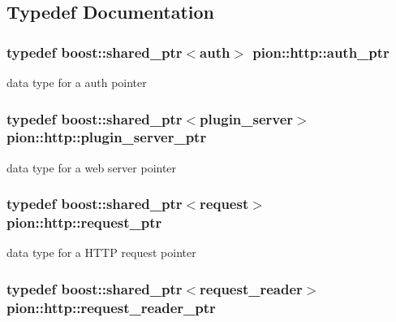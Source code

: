 \subsection{Typedef Documentation}
\hypertarget{namespacepion_1_1http_ad4fb4365aa7da70980fe02dfb13773e4}{
\subsubsection[{auth\-\_\-ptr}]{\setlength{\rightskip}{0pt plus 5cm}typedef boost\-::shared\-\_\-ptr$<${\bf auth}$>$ {\bf pion\-::http\-::auth\-\_\-ptr}}}\label{namespacepion_1_1http_ad4fb4365aa7da70980fe02dfb13773e4}


data type for a auth pointer 

\hypertarget{namespacepion_1_1http_a6ac91682b45c496ba05545e5f21a3dbd}{
\subsubsection[{plugin\-\_\-server\-\_\-ptr}]{\setlength{\rightskip}{0pt plus 5cm}typedef boost\-::shared\-\_\-ptr$<${\bf plugin\-\_\-server}$>$ {\bf pion\-::http\-::plugin\-\_\-server\-\_\-ptr}}}\label{namespacepion_1_1http_a6ac91682b45c496ba05545e5f21a3dbd}


data type for a web server pointer 

\hypertarget{namespacepion_1_1http_ace432b70a9459d50ff4969a7a47f0ccb}{
\subsubsection[{request\-\_\-ptr}]{\setlength{\rightskip}{0pt plus 5cm}typedef boost\-::shared\-\_\-ptr$<${\bf request}$>$ {\bf pion\-::http\-::request\-\_\-ptr}}}\label{namespacepion_1_1http_ace432b70a9459d50ff4969a7a47f0ccb}


data type for a H\-T\-T\-P request pointer 

\hypertarget{namespacepion_1_1http_ac22c195ee38fecd79d9330c4099ce3e9}{
\subsubsection[{request\-\_\-reader\-\_\-ptr}]{\setlength{\rightskip}{0pt plus 5cm}typedef boost\-::shared\-\_\-ptr$<${\bf request\-\_\-reader}$>$ {\bf pion\-::http\-::request\-\_\-reader\-\_\-ptr}}}\label{namespacepion_1_1http_ac22c195ee38fecd79d9330c4099ce3e9}


